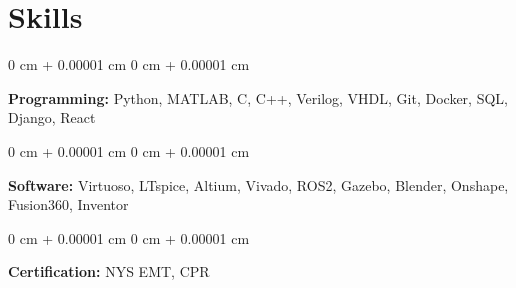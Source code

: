 \documentclass[11pt, letterpaper]{article}
\newenvironment{onecolentry}{
    \begin{adjustwidth}{
        0 cm + 0.00001 cm
    }{
        0 cm + 0.00001 cm
    }
}{
    \end{adjustwidth}
} %
\begin{document}
    
    \section{Skills}



        
        \begin{onecolentry}
            \textbf{Programming:} Python, MATLAB, C, C++, Verilog, VHDL, Git, Docker, SQL, Django, React
        \end{onecolentry}

        \vspace{0.15 cm}

        \begin{onecolentry}
            \textbf{Software:} Virtuoso, LTspice, Altium, Vivado, ROS2, Gazebo, Blender, Onshape, Fusion360, Inventor
        \end{onecolentry}

        \vspace{0.15 cm}

        \begin{onecolentry}
            \textbf{Certification:} NYS EMT, CPR
        \end{onecolentry}


    
\end{document}
